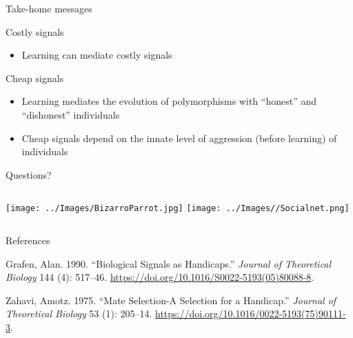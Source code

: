 \documentclass[
  ignorenonframetext,
  aspectratio=169]{beamer}
\providecommand{\tightlist}{%
  \setlength{\itemsep}{0pt}\setlength{\parskip}{0pt}}
\newlength{\cslhangindent}
\newlength{\cslentryspacingunit} %
\newenvironment{CSLReferences}[2] %
 {%
  \setlength{\parindent}{0pt}
  \ifodd #1
  \let\oldpar\par
  \def\par{\hangindent=\cslhangindent\oldpar}
  \fi
  \setlength{\parskip}{#2\cslentryspacingunit}
 }%
 {}
\begin{document}
\begin{frame}{Take-home messages}
\protect\hypertarget{take-home-messages}{}
\begin{block}{Costly signals}
\protect\hypertarget{costly-signals}{}
\begin{itemize}
\tightlist
\item
  Learning can mediate costly signals
\end{itemize}
\end{block}

\begin{block}{Cheap signals}
\protect\hypertarget{cheap-signals}{}
\begin{itemize}
\tightlist
\item
  Learning mediates the evolution of polymorphisms with ``honest'' and
  ``dishonest'' individuals
\item
  Cheap signals depend on the innate level of aggression (before
  learning) of individuals
\end{itemize}
\end{block}
\end{frame}

\begin{frame}{Questions?}
\protect\hypertarget{questions}{}
\begin{columns}[T]
  \texttt{[image: ../Images/BizarroParrot.jpg]}
  \texttt{[image: ../Images//Socialnet.png]}
\end{columns}
\end{frame}

\begin{frame}{References}
\protect\hypertarget{references}{}
\hypertarget{refs}{}
\begin{CSLReferences}{1}{0}
\leavevmode{}%
Grafen, Alan. 1990. {``Biological Signals as Handicaps.''} \emph{Journal
of Theoretical Biology} 144 (4): 517--46.
\url{https://doi.org/10.1016/S0022-5193(05)80088-8}.

\leavevmode{}%
Zahavi, Amotz. 1975. {``Mate Selection\textemdash -{A} Selection for a
Handicap.''} \emph{Journal of Theoretical Biology} 53 (1): 205--14.
\url{https://doi.org/10.1016/0022-5193(75)90111-3}.

\end{CSLReferences}
\end{frame}
\end{document}
